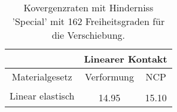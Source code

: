 \begin{table} 
\centering 
\begin{tabular}{c|cc|} 
\cline{2-3} 
 & \multicolumn{2}{|c|}{Linearer Kontakt} \\ 
\hline 
\multicolumn{1}{|c|}{Materialgesetz} & \multicolumn{1}{c|}{Verformung} & \multicolumn{1}{c|}{NCP} \\ 
\hline 
\multicolumn{1}{|c|}{\multirow{2}{*}{Linear elastisch}} &\multicolumn{1}{|c|}{} & \multicolumn{1}{|c|}{} \\ 
\multicolumn{1}{|c|}{} & \multicolumn{1}{|c|}{     14.95} & \multicolumn{1}{|c|}{     15.10} \\ 
\hline 
\end{tabular}\caption{Kovergenzraten mit Hinderniss 'Special' mit 162 Freiheitsgraden für die Verschiebung.}\label{tab:Rate_Special_level2}
\end{table} 
